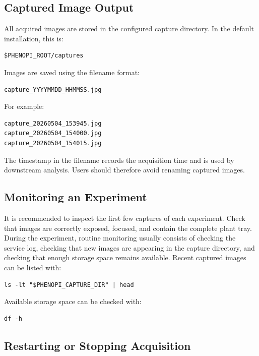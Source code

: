 \subsection{Captured Image Output}

All acquired images are stored in the configured capture directory. In the default installation, this is:

\begin{verbatim}
$PHENOPI_ROOT/captures
\end{verbatim}

Images are saved using the filename format:

\begin{verbatim}
capture_YYYYMMDD_HHMMSS.jpg
\end{verbatim}

For example:

\begin{verbatim}
capture_20260504_153945.jpg
capture_20260504_154000.jpg
capture_20260504_154015.jpg
\end{verbatim}

The timestamp in the filename records the acquisition time and is used by
downstream analysis. Users should therefore avoid renaming captured images.

\subsection{Monitoring an Experiment}

It is recommended to inspect the first few captures of each experiment. Check
that images are correctly exposed, focused, and contain the complete plant
tray. During the experiment, routine monitoring usually consists of checking
the service log, checking that new images are appearing in the capture
directory, and checking that enough storage space remains available. Recent
captured images can be listed with:

\begin{verbatim}
ls -lt "$PHENOPI_CAPTURE_DIR" | head
\end{verbatim}

Available storage space can be checked with:

\begin{verbatim}
df -h
\end{verbatim}

\subsection{Restarting or Stopping Acquisition}

